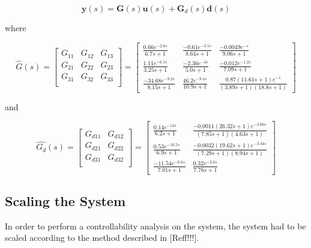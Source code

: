 \begin{equation}
\textbf{y}(s) = \textbf{G}(s)\textbf{u}(s) + \textbf{G}_{d}(s)\textbf{d}(s)
\end{equation}

where

\begin{equation}
\hat{G}(s) = \begin{bmatrix}
G_{11} & G_{12} & G_{13} \\
G_{21} & G_{22} & G_{23} \\
G_{31} & G_{32} & G_{33} \\
\end{bmatrix} = \begin{bmatrix}
\frac{0.66e^{-2.6s}}{6.7s+1} & \frac{-0.61e^{-3.5s}}{8.64s+1} & \frac{-0.0049e^{-s}}{9.06s+1} \\
\frac{1.11e^{-6.5s}}{3.25s+1} & \frac{-2.36e^{-3s}}{5.0s+1} & \frac{-0.012e^{-1.2s}}{7.09s+1} \\
\frac{-34.68e^{-9.2s}}{8.15s+1} & \frac{46.2e^{-9.4s}}{10.9s+1} & \frac{0.87(11.61s+1)e^{-s}}{(3.89s+1)(18.8s+1)}
\end{bmatrix}
\end{equation}

and

\begin{equation}
\hat{G_d}(s) = \begin{bmatrix}
G_{d11} & G_{d12} \\
G_{d21} & G_{d22} \\
G_{d31} & G_{d32} \\
\end{bmatrix} = \begin{bmatrix}
\frac{0.14e^{-12s}}{6.2s+1} & \frac{-0.0011(26.32s+1)e^{-2.66s}}{(7.85s+1)(4.63s+1)} \\
\frac{0.53e^{-10.5s}}{6.9s+1} & \frac{-0.0032(19.62s+1)e^{-3.44s}}{(7.29s+1)(8.94s+1)} \\
\frac{-11.54e^{-0.6s}}{7.01s+1} & \frac{0.32e^{-2.6s}}{7.76s+1}
\end{bmatrix}
\end{equation}

\subsection{Scaling the System}

In order to perform a controllability analysis on the system, the system had to be scaled according to the method described in [Reff!!!].

